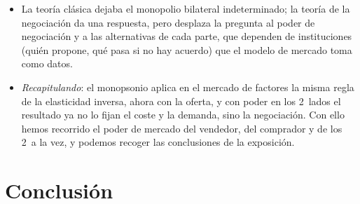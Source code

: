 \documentclass[11pt]{article}
\begin{document}
\begin{itemize}
\item La teoría clásica dejaba el monopolio bilateral indeterminado; la teoría de la negociación da una respuesta, pero desplaza la pregunta al poder de negociación y a las alternativas de cada parte, que dependen de instituciones (quién propone, qué pasa si no hay acuerdo) que el modelo de mercado toma como datos.
\item \emph{Recapitulando}: el monopsonio aplica en el mercado de factores la misma regla de la elasticidad inversa, ahora con la oferta, y con poder en los 2~lados el resultado ya no lo fijan el coste y la demanda, sino la negociación. Con ello hemos recorrido el poder de mercado del vendedor, del comprador y de los 2~a la vez, y podemos recoger las conclusiones de la exposición.
\end{itemize}

\section*{Conclusión}
\end{document}
